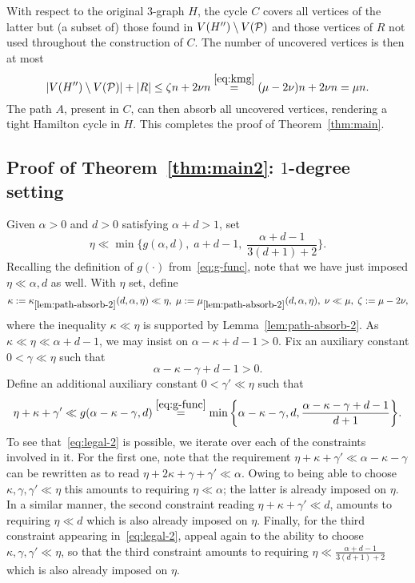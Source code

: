 \documentclass[11pt,reqno]{amsart}
\def\absrefone{\mathrm{\ref{lem:path-absorb-2}}}
\begin{document}
With respect to the original $3$-graph $H$, the cycle $C$ covers all vertices of the latter but (a subset of) those found in $V(H'') \setminus V(\mathcal{P})$ and those vertices of $R$ not used throughout the construction of $C$. The number of uncovered vertices is then at most 
$$
|V(H'') \setminus V(\mathcal{P})| + |R| \leq \zeta n + 2 \nu n \overset{\eqref{eq:kmg}}{=} (\mu - 2 \nu)n +2 \nu n = \mu n.
$$
The path $A$, present in $C$, can then absorb all uncovered vertices, rendering a tight Hamilton cycle in $H$. This completes the proof of Theorem~\ref{thm:main}.

\subsection{Proof of Theorem~\ref{thm:main2}: $1$-degree setting}\label{sec:proof-main-2}

Given $\alpha > 0 $ and $d >0$ satisfying $\alpha +d > 1$, set 
$$
\eta \ll \min\bigg\{g(\alpha,d),\; a+d-1,\; \frac{\alpha +d-1}{3(d+1)+2}\bigg\}.
$$ 
Recalling the definition of $g(\cdot)$ from~\eqref{eq:g-func}, note that we have just imposed $\eta \ll \alpha, d$ as well. 
With $\eta$ set, define 
$$
\kappa:= \kappa_{\absrefone}(d,\alpha,\eta) \ll \eta,\; \mu := \mu_{\absrefone} (d,\alpha,\eta),\; \nu \ll \mu,\; \zeta:= \mu -2 \nu,
$$
where the inequality $\kappa \ll \eta$ is supported by Lemma~\ref{lem:path-absorb-2}. 
As $\kappa \ll \eta \ll \alpha + d - 1$, we may insist on $\alpha -\kappa +d -1 >0$. 
Fix an auxiliary constant $0 < \gamma \ll \eta$ such that 
\begin{equation}\label{eq:legal-1}
\alpha -\kappa - \gamma + d -1 >0.
\end{equation}
Define an additional auxiliary constant $0 < \gamma' \ll \eta$ such that 
\begin{equation}\label{eq:legal-2}
\eta + \kappa + \gamma' \ll g(\alpha -\kappa-\gamma,d) \overset{\eqref{eq:g-func}}{=} \min \bigg\{\alpha -\kappa-\gamma,d, \frac{\alpha-\kappa-\gamma+d-1}{d+1} \bigg\}.
\end{equation}
To see that~\eqref{eq:legal-2} is possible, we iterate over each of the constraints involved in it. For the first one, note that the requirement $\eta + \kappa + \gamma' \ll \alpha -\kappa-\gamma$ can be rewritten as to read 
$\eta +2\kappa +\gamma + \gamma' \ll \alpha$. Owing to being able to choose $\kappa,\gamma,\gamma' \ll \eta$ this amounts to requiring $ \eta \ll \alpha$; the latter is already imposed on $\eta$. In a similar manner, the second constraint reading $\eta + \kappa + \gamma' \ll d$, amounts to requiring $\eta \ll d$ which is also already imposed on $\eta$. Finally, for the third constraint appearing in~\eqref{eq:legal-2}, appeal again to the ability to choose $\kappa,\gamma,\gamma' \ll \eta$, so that the third constraint amounts to requiring 
$\eta \ll \frac{\alpha +d-1}{3(d+1)+2}$ which is also already imposed on $\eta$. 
\end{document}
